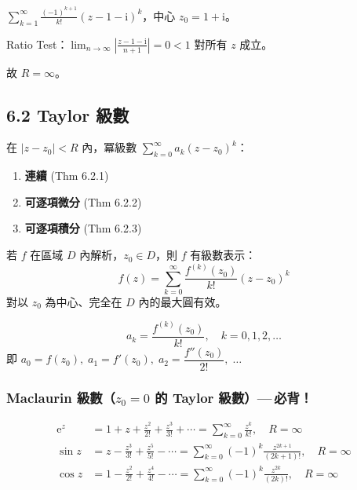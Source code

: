 \documentclass[12pt,a4paper]{article}
\newcommand{\ii}{\mathrm{i}}
\newcommand{\ee}{\mathrm{e}}
\begin{document}
\begin{exbox}[收斂半徑範例]
$\displaystyle\sum_{k=1}^{\infty}\frac{(-1)^{k+1}}{k!}(z-1-\ii)^k$，中心 $z_0=1+\ii$。

Ratio Test：$\displaystyle\lim_{n\to\infty}\left|\frac{z-1-\ii}{n+1}\right|=0<1$ 對所有 $z$ 成立。

故 $R=\infty$。
\end{exbox}

\subsection{6.2 Taylor 級數}

\begin{keybox}[冪級數在收斂半徑內的性質]
在 $|z-z_0|<R$ 內，冪級數 $\displaystyle\sum_{k=0}^{\infty}a_k(z-z_0)^k$：
\begin{enumerate}[nosep]
\item \textbf{連續} (Thm 6.2.1)
\item \textbf{可逐項微分} (Thm 6.2.2)
\item \textbf{可逐項積分} (Thm 6.2.3)
\end{enumerate}
\end{keybox}

\begin{theorembox}
若 $f$ 在區域 $D$ 內解析，$z_0\in D$，則 $f$ 有級數表示：
$$f(z)=\sum_{k=0}^{\infty}\frac{f^{(k)}(z_0)}{k!}(z-z_0)^k$$
對以 $z_0$ 為中心、完全在 $D$ 內的最大圓有效。
\end{theorembox}

\begin{keybox}
$$a_k=\frac{f^{(k)}(z_0)}{k!}, \quad k=0,1,2,\dots$$
即 $a_0=f(z_0),\; a_1=f'(z_0),\; a_2=\dfrac{f''(z_0)}{2!},\;\dots$
\end{keybox}

\begin{keybox}[收斂半徑 $R$ = 中心 $z_0$ 到最近 isolated singularity 的距離]
\end{keybox}

\subsubsection*{Maclaurin 級數（$z_0=0$ 的 Taylor 級數）---\,必背！}

\begin{keybox}[三大 Maclaurin 級數]
\begin{align}
\ee^z &= 1+z+\frac{z^2}{2!}+\frac{z^3}{3!}+\cdots = \sum_{k=0}^{\infty}\frac{z^k}{k!}, \quad R=\infty \\[6pt]
\sin z &= z-\frac{z^3}{3!}+\frac{z^5}{5!}-\cdots = \sum_{k=0}^{\infty}(-1)^k\frac{z^{2k+1}}{(2k+1)!}, \quad R=\infty \\[6pt]
\cos z &= 1-\frac{z^2}{2!}+\frac{z^4}{4!}-\cdots = \sum_{k=0}^{\infty}(-1)^k\frac{z^{2k}}{(2k)!}, \quad R=\infty
\end{align}
\end{keybox}
\end{document}
